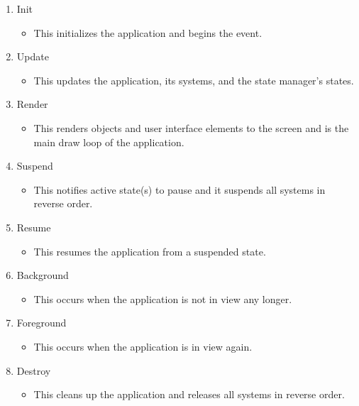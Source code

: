 \begin{enumerate}[nolistsep,topsep=10pt]
	
	\item Init
	\begin{itemize}[nolistsep,topsep=0pt]
		\item This initializes the application and begins the  event.
	\end{itemize}
	
	\item Update
	\begin{itemize}[nolistsep,topsep=0pt]
		\item This updates the application, its systems, and the state manager's states.
	\end{itemize}
	
	\item Render
	\begin{itemize}[nolistsep,topsep=0pt]
		\item This renders objects and user interface elements to the screen and is the main draw loop of the application.
	\end{itemize}
	
	\item Suspend
	\begin{itemize}[nolistsep,topsep=0pt]
		\item This notifies active state(s) to pause and it suspends all systems in reverse order.
	\end{itemize}
	
	\item Resume
	\begin{itemize}[nolistsep,topsep=0pt]
		\item This resumes the application from a suspended state.
	\end{itemize}
	
	\item Background
	\begin{itemize}[nolistsep,topsep=0pt]
		\item This occurs when the application is not in view any longer.
	\end{itemize}
	
	\item Foreground
	\begin{itemize}[nolistsep,topsep=0pt]
		\item This occurs when the application is in view again.
	\end{itemize}
	
	\item Destroy
	\begin{itemize}[nolistsep,topsep=0pt]
		\item This cleans up the application and releases all systems in reverse order.
	\end{itemize}
	
\end{enumerate}

